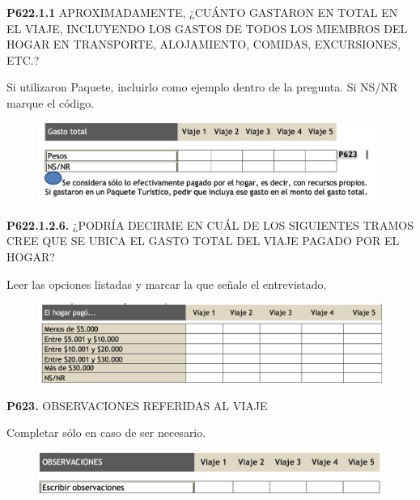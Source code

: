 \documentclass[
  openany]{book}
\begin{document}
\textbf{P622.1.1} APROXIMADAMENTE, ¿CUÁNTO GASTARON EN TOTAL EN EL VIAJE, INCLUYENDO LOS GASTOS DE TODOS LOS MIEMBROS DEL HOGAR EN TRANSPORTE, ALOJAMIENTO, COMIDAS, EXCURSIONES, ETC.?

Si utilizaron Paquete, incluirlo como ejemplo dentro de la pregunta. Si NS/NR marque el código.

\begin{figure}

{\centering \includegraphics[width=1\linewidth]{imagenes/figura6-232} 

}

\end{figure}

\textbf{P622.1.2.6.} ¿PODRÍA DECIRME EN CUÁL DE LOS SIGUIENTES TRAMOS CREE QUE SE UBICA EL GASTO TOTAL DEL VIAJE PAGADO POR EL HOGAR?

Leer las opciones listadas y marcar la que señale el entrevistado.

\begin{figure}

{\centering \includegraphics[width=1\linewidth]{imagenes/figura6-233} 

}

\end{figure}

\textbf{P623.} OBSERVACIONES REFERIDAS AL VIAJE

Completar sólo en caso de ser necesario.

\begin{figure}

{\centering \includegraphics[width=1\linewidth]{imagenes/figura6-234} 

}

\end{figure}
\end{document}
